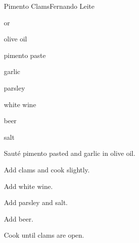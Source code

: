 \begin{recipe}{Pimento Clams}{Fernando Leite}{}

\begin{ingredients}
\item {} or 
\item olive oil
\item pimento paste
\item garlic
\item parsley
\item white wine
\item beer
\item salt
\end{ingredients}

\begin{directions}
\item Saut\'e pimento pasted and garlic in olive oil.
\item Add clams and cook slightly.
\item Add white wine.
\item Add parsley and salt.
\item Add beer.
\item Cook until clams are open.
\end{directions}

\end{recipe}
